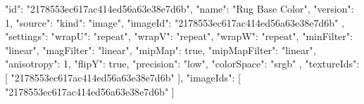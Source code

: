{
  "id": "2178553ec617ac414ed56a63e38e7d6b",
  "name": "Rug Base Color",
  "version": 1,
  "source": {
    "kind": "image",
    "imageId": "2178553ec617ac414ed56a63e38e7d6b"
  },
  "settings": {
    "wrapU": "repeat",
    "wrapV": "repeat",
    "wrapW": "repeat",
    "minFilter": "linear",
    "magFilter": "linear",
    "mipMap": true,
    "mipMapFilter": "linear",
    "anisotropy": 1,
    "flipY": true,
    "precision": "low",
    "colorSpace": "srgb"
  },
  "textureIds": [
    "2178553ec617ac414ed56a63e38e7d6b"
  ],
  "imageIds": [
    "2178553ec617ac414ed56a63e38e7d6b"
  ]
}
